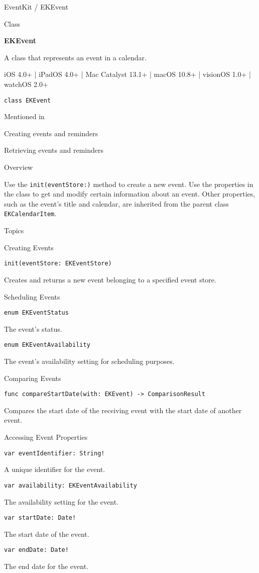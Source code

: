 \documentclass{article}
\title{}
\author{}
\date{}
\begin{document}
EventKit / EKEvent

Class

\textbf{EKEvent}

A class that represents an event in a calendar.

iOS 4.0+ | iPadOS 4.0+ | Mac Catalyst 13.1+ | macOS 10.8+ | visionOS 1.0+ | watchOS 2.0+

\texttt{class EKEvent}

Mentioned in

Creating events and reminders

Retrieving events and reminders

Overview

Use the \texttt{init(eventStore:)} method to create a new event. Use the properties in the class to get and modify certain information about an event. Other properties, such as the event's title and calendar, are inherited from the parent class \texttt{EKCalendarItem}.

Topics

Creating Events

\texttt{init(eventStore: EKEventStore)}

Creates and returns a new event belonging to a specified event store.

Scheduling Events

\texttt{enum EKEventStatus}

The event's status.

\texttt{enum EKEventAvailability}

The event's availability setting for scheduling purposes.

Comparing Events

\texttt{func compareStartDate(with: EKEvent) -> ComparisonResult}

Compares the start date of the receiving event with the start date of another event.

Accessing Event Properties

\texttt{var eventIdentifier: String!}

A unique identifier for the event.

\texttt{var availability: EKEventAvailability}

The availability setting for the event.

\texttt{var startDate: Date!}

The start date of the event.

\texttt{var endDate: Date!}

The end date for the event.
\end{document}
